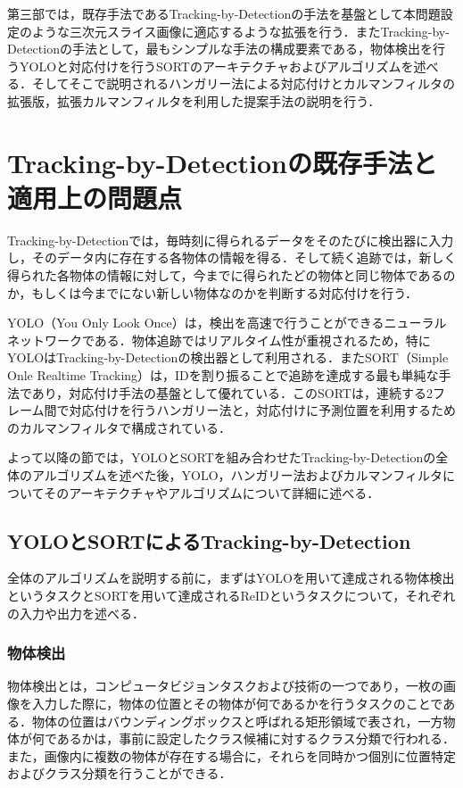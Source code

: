 \thispagestyle{fancy2}

第三部では，既存手法であるTracking-by-Detectionの手法を基盤として本問題設定のような三次元スライス画像に適応するような拡張を行う．またTracking-by-Detectionの手法として，最もシンプルな手法の構成要素である，物体検出を行うYOLOと対応付けを行うSORTのアーキテクチャおよびアルゴリズムを述べる．そしてそこで説明されるハンガリー法による対応付けとカルマンフィルタの拡張版，拡張カルマンフィルタを利用した提案手法の説明を行う．

\section{Tracking-by-Detectionの既存手法と適用上の問題点}
\label{sec:existing_method}

Tracking-by-Detectionでは，毎時刻に得られるデータをそのたびに検出器に入力し，そのデータ内に存在する各物体の情報を得る．そして続く追跡では，新しく得られた各物体の情報に対して，今までに得られたどの物体と同じ物体であるのか，もしくは今までにない新しい物体なのかを判断する対応付けを行う．

YOLO（You Only Look Once）\cite{redmon2016you, alif2024yolov1}は，検出を高速で行うことができるニューラルネットワークである．物体追跡ではリアルタイム性が重視されるため，特にYOLOはTracking-by-Detectionの検出器として利用される．またSORT（Simple Onle Realtime Tracking）\cite{bewley2016simple,wojke2017simple,du2023strongsort}は，IDを割り振ることで追跡を達成する最も単純な手法であり，対応付け手法の基盤として優れている．このSORTは，連続する2フレーム間で対応付けを行うハンガリー法\cite{kuhn1955hungarian}と，対応付けに予測位置を利用するためのカルマンフィルタ\cite{bishop2001introduction}で構成されている．

よって以降の節では，YOLOとSORTを組み合わせたTracking-by-Detectionの全体のアルゴリズムを述べた後，YOLO，ハンガリー法およびカルマンフィルタについてそのアーキテクチャやアルゴリズムについて詳細に述べる．

    \subsection{YOLOとSORTによるTracking-by-Detection}
    \label{subsec:yolo_and_sort}
    
    全体のアルゴリズムを説明する前に，まずはYOLOを用いて達成される物体検出というタスクとSORTを用いて達成されるReIDというタスクについて，それぞれの入力や出力を述べる．

    \subsubsection{物体検出}
    物体検出とは，コンピュータビジョンタスクおよび技術の一つであり，一枚の画像を入力した際に，物体の位置とその物体が何であるかを行うタスクのことである．物体の位置はバウンディングボックスと呼ばれる矩形領域で表され，一方物体が何であるかは，事前に設定したクラス候補に対するクラス分類で行われる．また，画像内に複数の物体が存在する場合に，それらを同時かつ個別に位置特定およびクラス分類を行うことができる．

